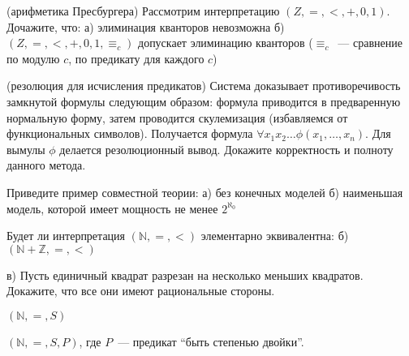 \setcounter{curtask}{21}


\begin{task}(арифметика Пресбургера)
    Рассмотрим интерпретацию $(Z, =, <, +, 0, 1)$.
    Дочажите, что:
    а) элиминация кванторов невозможна
    б) $(Z, =, <, +, 0, 1, \equiv_c)$ допускает элиминацию кванторов
    ($\equiv_c$~--- сравнение по модулю $c$, по предикату для каждого $c$)
\end{task}

\begin{task}(резолюция для исчисления предикатов)
    Система доказывает противоречивость замкнутой формулы следующим
    образом: формула приводится в предваренную нормальную форму, затем
    проводится скулемизация (избавляемся от функциональных
    символов). Получается формула $\forall x_1 x_2 \dots
    \phi(x_1, \dots, x_n)$. Для вымулы $\phi$ делается резолюционный
    вывод. Докажите корректность и полноту данного метода.
\end{task}

\begin{task}
    Приведите пример совместной теории:
    а) без конечных моделей
    б) наименьшая модель, которой имеет мощность не менее $2^{\aleph_0}$
\end{task}

\breakline


\begin{ptask}{13}
    Будет ли интерпретация $(\mathbb{N}, =, <)$ элементарно
    эквивалентна:
    б) $(\mathbb{N} + \mathbb{Z}, =, <)$
\end{ptask}

\begin{ptask}{14}
    в) Пусть единичный квадрат разрезан на несколько меньших
    квадратов. Докажите, что все они имеют рациональные стороны.
\end{ptask}

\begin{ptask}{19}
    $(\mathbb{N}, =, S)$
\end{ptask}

\begin{ptask}{20}
    $(\mathbb{N}, =, S, P)$, где $P$~--- предикат ``быть степенью двойки''.
\end{ptask}